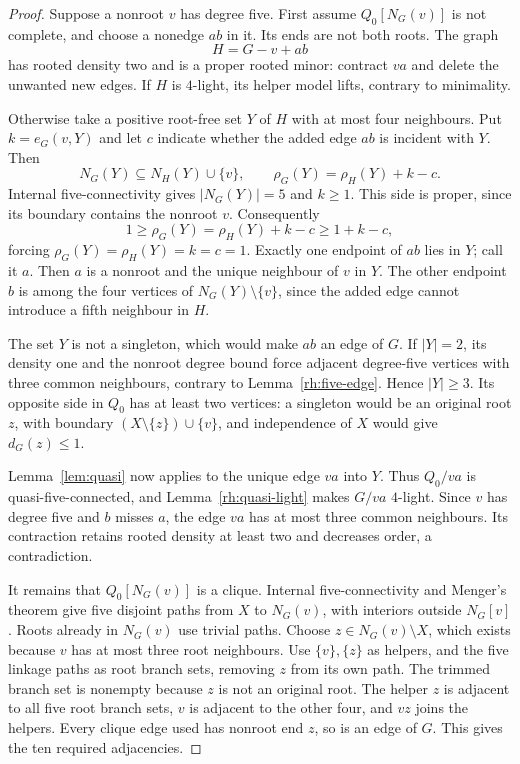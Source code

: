 \begin{proof}
Suppose a nonroot $v$ has degree five. First assume $Q_0[N_G(v)]$ is
not complete, and choose a nonedge $ab$ in it. Its ends are not both
roots. The graph
\[
 H=G-v+ab
\]
has rooted density two and is a proper rooted minor: contract $va$
and delete the unwanted new edges. If $H$ is $4$-light, its helper
model lifts, contrary to minimality.

Otherwise take a positive root-free set $Y$ of $H$ with at most four
neighbours. Put $k=e_G(v,Y)$ and let $c$ indicate whether the added
edge $ab$ is incident with $Y$. Then
\[
 N_G(Y)\subseteq N_H(Y)\cup\{v\},\qquad
 \rho_G(Y)=\rho_H(Y)+k-c.
\]
Internal five-connectivity gives $|N_G(Y)|=5$ and $k\ge1$. This side
is proper, since its boundary contains the nonroot $v$. Consequently
\[
 1\ge\rho_G(Y)=\rho_H(Y)+k-c\ge1+k-c,
\]
forcing $\rho_G(Y)=\rho_H(Y)=k=c=1$. Exactly one endpoint of $ab$
lies in $Y$; call it $a$. Then $a$ is a nonroot and the unique neighbour
of $v$ in $Y$. The other endpoint $b$ is among the four vertices of
$N_G(Y)\setminus\{v\}$, since the added edge cannot introduce a fifth
neighbour in $H$.

The set $Y$ is not a singleton, which would make $ab$ an edge of $G$.
If $|Y|=2$, its density one and the nonroot degree bound force adjacent
degree-five vertices with three common neighbours, contrary to
Lemma~\ref{rh:five-edge}. Hence $|Y|\ge3$. Its opposite side in
$Q_0$ has at least two vertices: a singleton would be an original root
$z$, with boundary $(X\setminus\{z\})\cup\{v\}$, and independence
of $X$ would give $d_G(z)\le1$.

Lemma~\ref{lem:quasi} now applies to the unique edge $va$ into $Y$.
Thus $Q_0/va$ is quasi-five-connected, and Lemma~\ref{rh:quasi-light}
makes $G/va$ $4$-light. Since $v$ has degree five and $b$ misses $a$,
the edge $va$ has at most three common neighbours. Its contraction
retains rooted density at least two and decreases order, a contradiction.

It remains that $Q_0[N_G(v)]$ is a clique. Internal five-connectivity
and Menger's theorem give five disjoint paths from $X$ to $N_G(v)$,
with interiors outside $N_G[v]$. Roots already in $N_G(v)$ use trivial
paths. Choose $z\in N_G(v)\setminus X$, which exists because $v$ has
at most three root neighbours. Use $\{v\},\{z\}$ as helpers, and the
five linkage paths as root branch sets, removing $z$ from its own path.
The trimmed branch set is nonempty because $z$ is not an original root.
The helper $z$ is adjacent to all five root branch sets, $v$ is adjacent
to the other four, and $vz$ joins the helpers. Every clique edge used
has nonroot end $z$, so is an edge of $G$. This gives the ten required
adjacencies.
\end{proof}

